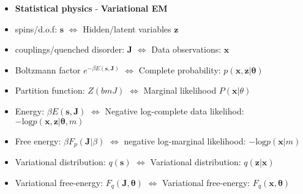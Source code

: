 \documentclass[norsk,a4paper,11pt]{article}
\begin{document}
\begin{itemize}
	\begin{itemize}
		\item \textbf{Statistical physics} - \textbf{Variational EM}
		\item spins/d.o.f: $\bm{s}$ $\Leftrightarrow$ Hidden/latent variables $\bm{z}$
		\item couplings/quenched disorder: $\bm{J}$ $\Leftrightarrow$ Data observations: $\bm{x}$
		\item Boltzmann factor $e^{-\beta E (\bm{s}, \bm{J})}$ $\Leftrightarrow$ Complete probability: $p(\bm{x}, \bm{z}|\bm{\theta})$
		\item Partition function: $Z(bm{J})$ $\Leftrightarrow$ Marginal likelihood $P(\bm{x}|\theta)$
		\item Energy: $\beta E(\bm{s}, \bm{J})$ $\Leftrightarrow$ Negative log-complete data likelihod: $-\text{log} p(\bm{x}, \bm{z}|\bm{\theta}, m)$
		\item Free energy: $\beta F_p (\bm{J}|\beta)$ $\Leftrightarrow$ negative log-marginal likelihood: $-\text{log} p(\bm{x}|m)$
		\item Variational distribution: $q(\bm{s})$ $\Leftrightarrow$ Variational distribution: $q(\bm{z}|\bm{x})$
		\item Variational free-energy: $F_q(\bm{J}, \bm{\theta})$ $\Leftrightarrow$ Variational free-energy: $F_q(\bm{x}, \bm{\theta})$
	\end{itemize}
\end{itemize}
\end{document}
